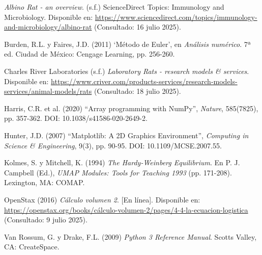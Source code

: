 \documentclass[12pt]{article}
\begin{document}
\begin{thebibliography}{9}

\textit{Albino Rat - an overview}. (s.f.) ScienceDirect Topics: Immunology and Microbiology. Disponible en: \url{https://www.sciencedirect.com/topics/immunology-and-microbiology/albino-rat} (Consultado: 16 julio 2025).

Burden, R.L. y Faires, J.D. (2011) `Método de Euler', en \textit{Análisis numérico}. 7ª ed. Ciudad de México: Cengage Learning, pp. 256-260.

Charles River Laboratories (s.f.) \textit{Laboratory Rats - research models \& services}. Disponible en: \url{https://www.criver.com/products-services/research-models-services/animal-models/rats} (Consultado: 18 julio 2025).

Harris, C.R. et al. (2020) ``Array programming with NumPy'', \textit{Nature}, 585(7825), pp. 357-362. DOI: 10.1038/s41586-020-2649-2.

Hunter, J.D. (2007) ``Matplotlib: A 2D Graphics Environment'', \textit{Computing in Science \& Engineering}, 9(3), pp. 90-95. DOI: 10.1109/MCSE.2007.55.

Kolmes, S. y Mitchell, K. (1994) \textit{The Hardy-Weinberg Equilibrium}. En P. J. Campbell (Ed.), \textit{UMAP Modules: Tools for Teaching 1993} (pp. 171-208). Lexington, MA: COMAP.

OpenStax (2016) \textit{Cálculo volumen 2}. [En línea]. Disponible en: \url{https://openstax.org/books/cálculo-volumen-2/pages/4-4-la-ecuacion-logistica} (Consultado: 9 julio 2025).

Van Rossum, G. y Drake, F.L. (2009) \textit{Python 3 Reference Manual}. Scotts Valley, CA: CreateSpace.

\end{thebibliography}
\end{document}

